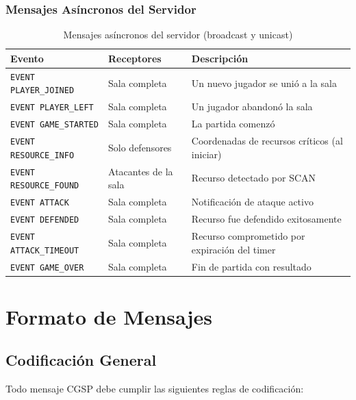 \documentclass[12pt, letterpaper]{article}
\begin{document}
\subsubsection{Mensajes Asíncronos del Servidor}

\begin{table}[H]
\centering
\begin{tabularx}{\textwidth}{l l X}
\toprule
\textbf{Evento} & \textbf{Receptores} & \textbf{Descripción} \\
\midrule
\texttt{EVENT PLAYER\_JOINED}  & Sala completa    & Un nuevo jugador se unió a la sala \\
\texttt{EVENT PLAYER\_LEFT}    & Sala completa    & Un jugador abandonó la sala \\
\texttt{EVENT GAME\_STARTED}   & Sala completa    & La partida comenzó \\
\texttt{EVENT RESOURCE\_INFO}  & Solo defensores  & Coordenadas de recursos críticos (al iniciar) \\
\texttt{EVENT RESOURCE\_FOUND} & Atacantes de la sala & Recurso detectado por SCAN \\
\texttt{EVENT ATTACK}          & Sala completa    & Notificación de ataque activo \\
\texttt{EVENT DEFENDED}        & Sala completa    & Recurso fue defendido exitosamente \\
\texttt{EVENT ATTACK\_TIMEOUT} & Sala completa    & Recurso comprometido por expiración del timer \\
\texttt{EVENT GAME\_OVER}      & Sala completa    & Fin de partida con resultado \\
\bottomrule
\end{tabularx}
\caption{Mensajes asíncronos del servidor (broadcast y unicast)}
\end{table}

\section{Formato de Mensajes}

\subsection{Codificación General}

Todo mensaje CGSP debe cumplir las siguientes reglas de codificación:
\end{document}
